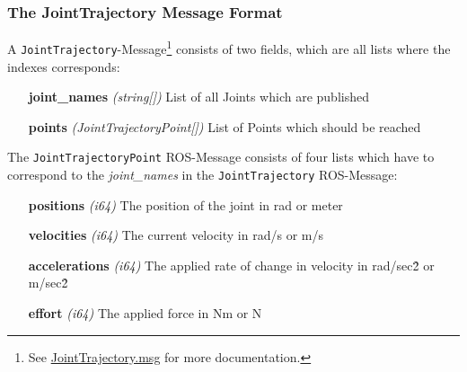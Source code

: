 \subsubsection[JointTrajectoryPose-Message]{The JointTrajectory Message Format} \label{sec:deom-publisher-message}

A \texttt{JointTrajectory}-Message\footnote{See \href{https://docs.ros2.org/latest/api/trajectory_msgs/msg/JointTrajectory.html}{JointTrajectory.msg} for more documentation.} consists of two fields, which are all lists where the indexes corresponds:

\begin{enumerate}
    \item[\textbf{joint\_names}] \textit{(string[])} List of all Joints which are published
    \item[\textbf{points}] \textit{(JointTrajectoryPoint[])} List of Points which should be reached
\end{enumerate}

The \texttt{JointTrajectoryPoint} ROS-Message consists of four lists which have to correspond to the \textit{joint\_names} in the \texttt{JointTrajectory} ROS-Message:

\begin{enumerate}
    \item[\textbf{positions}] \textit{(i64)} The position of the joint in rad or meter
    \item[\textbf{velocities}] \textit{(i64)} The current velocity in rad/s or m/s
    \item[\textbf{accelerations}] \textit{(i64)} The applied rate of change in velocity in rad/sec\^2 or m/sec\^2
    \item[\textbf{effort}] \textit{(i64)} The applied force in Nm or N
\end{enumerate}



